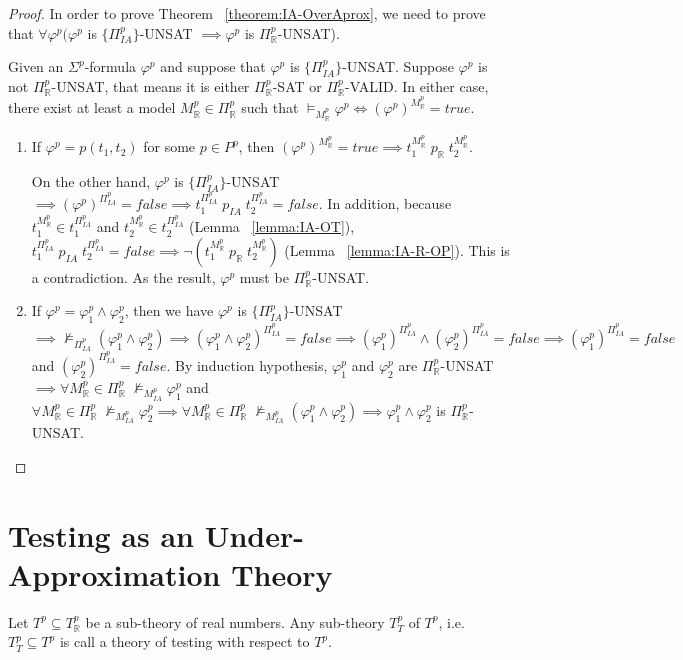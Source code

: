 \begin{proof}
In order to prove Theorem ~\ref{theorem:IA-OverAprox}, we need to prove that $\forall \varphi^p (\varphi^p$ is $\{\Pi^p_{IA}\}$-UNSAT $\implies \varphi^p$ is $\Pi^p_\mathbb{R}$-UNSAT). 

Given an $\Sigma^p$-formula $\varphi^p$ and suppose that $\varphi^p$ is $\{\Pi^p_{IA}\}$-UNSAT.
Suppose $\varphi^p$ is not $\Pi^p_\mathbb{R}$-UNSAT, that means it is either  $\Pi^p_\mathbb{R}$-SAT or  $\Pi^p_\mathbb{R}$-VALID. In either case, there exist at least a model $M^p_\mathbb{R} \in \Pi^p_\mathbb{R}$ such that $\models_{M^p_\mathbb{R}} \varphi^p \iff (\varphi^p)^{M^p_\mathbb{R}}= true$.
\begin{enumerate}
\item If $\varphi^p = p(t_1, t_2)$ for some $p \in P^p$, then $(\varphi^p)^{M^p_\mathbb{R}}= true \implies t_1^{M^p_\mathbb{R}} \; p_\mathbb{R} \; t_2^{M^p_\mathbb{R}}$. 

On the other hand, $\varphi^p$ is $\{\Pi^p_{IA}\}$-UNSAT $\implies (\varphi^p)^{\Pi^p_{IA}} = false \implies t_1^{\Pi^p_{IA}} \; p_{IA} \; t_2^{\Pi^p_{IA}} = false$. In addition, because $t_1^{M^p_\mathbb{R}} \in t_1^{\Pi^p_{IA}}$ and $t_2^{M^p_\mathbb{R}} \in t_2^{\Pi^p_{IA}}$ (Lemma ~\ref{lemma:IA-OT}), $t_1^{\Pi^p_{IA}} \; p_{IA} \; t_2^{\Pi^p_{IA}} = false \implies \neg(t_1^{M^p_\mathbb{R}} \; p_\mathbb{R} \; t_2^{M^p_\mathbb{R}})$ (Lemma ~\ref{lemma:IA-R-OP}). This is a contradiction. As the result, $\varphi^p$ must be $\Pi^p_\mathbb{R}$-UNSAT.
\item If $\varphi^p = \varphi^p_1 \wedge \varphi^p_2$, then we have $\varphi^p$ is  $\{\Pi^p_{IA}\}$-UNSAT $\implies \not\models_{\Pi^p_{IA}}(\varphi^p_1 \wedge \varphi^p_2) \implies (\varphi^p_1 \wedge \varphi^p_2)^{\Pi^p_{IA}} = false \implies (\varphi^p_1)^{\Pi^p_{IA}} \wedge (\varphi^p_2)^{\Pi^p_{IA}} = false \implies (\varphi^p_1)^{\Pi^p_{IA}} = false$ and $(\varphi^p_2)^{\Pi^p_{IA}} = false$. By induction hypothesis, $\varphi^p_1$ and $\varphi^p_2$ are $\Pi^p_\mathbb{R}$-UNSAT $\implies \forall M^p_\mathbb{R} \in \Pi^p_\mathbb{R} \; \not\models_{M^p_{IA}} \varphi^p_1$ and $\forall M^p_\mathbb{R} \in \Pi^p_\mathbb{R} \; \not\models_{M^p_{IA}} \varphi^p_2 \implies \forall M^p_\mathbb{R} \in \Pi^p_\mathbb{R} \; \not\models_{M^p_{IA}} (\varphi^p_1 \wedge \varphi^p_2) \implies \varphi^p_1 \wedge \varphi^p_2$ is $\Pi^p_\mathbb{R}$-UNSAT.
\end{enumerate}
\end{proof}

\section{Testing as an Under-Approximation Theory}
\begin{definition}
Let $T^p \subseteq T^p_\mathbb{R}$ be a sub-theory of real numbers. Any sub-theory $T^p_T$ of $T^p$, i.e. $T^p_T \subseteq T^p$ is call a theory of testing with respect to $T^p$.
\end{definition}

